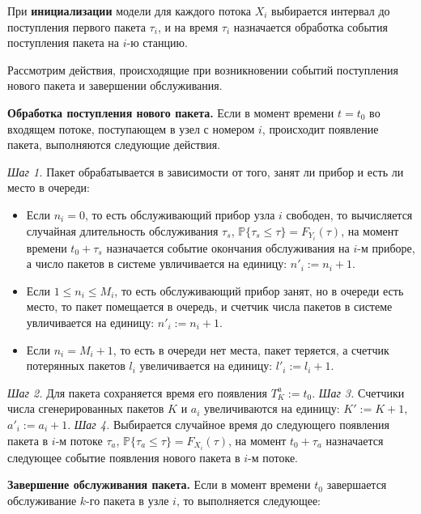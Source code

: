 При \textbf{инициализации} модели для каждого потока $X_i$ выбирается интервал до поступления первого пакета $\tau_i$, и на время $\tau_i$ назначается обработка события поступления пакета на $i$-ю станцию.

Рассмотрим действия, происходящие при возникновении событий поступления нового пакета и завершении обслуживания.

\textbf{Обработка поступления нового пакета.} Если в момент времени $t = t_0$ во входящем потоке, поступающем в узел с номером $i$, происходит появление пакета, выполняются следующие действия.

\textit{Шаг 1.} Пакет обрабатывается в зависимости от того, занят ли прибор и есть ли место в очереди:
\begin{itemize}
  \item Если $n_i = 0$, то есть обслуживающий прибор узла $i$ свободен, то вычисляется случайная длительность обслуживания $\tau_s$, $\mathbb{P}\{\tau_s \leqslant \tau\} = F_{Y_i}(\tau)$, на момент времени $t_0 + \tau_s$ назначается событие окончания обслуживания на $i$-м приборе, а число пакетов в системе увличивается на единицу: $n'_i := n_i + 1$.
  \item Если $1 \leqslant n_i \leqslant M_i$, то есть обслуживающий прибор занят, но в очереди есть место, то пакет помещается в очередь, и счетчик числа пакетов в системе увличивается на единицу: $n'_i := n_i + 1$.
  \item Если $n_i = M_i + 1$, то есть в очереди нет места, пакет теряется, а счетчик потерянных пакетов $l_i$ увеличивается на единицу: $l'_i := l_i + 1$.
\end{itemize}

\textit{Шаг 2.} Для пакета сохраняется время его появления $T_K^a := t_0$.
\textit{Шаг 3.} Счетчики числа сгенерированных пакетов $K$ и $a_i$ увеличиваются на единицу: $K' := K + 1$, $a'_i := a_i + 1$.
\textit{Шаг 4.} Выбирается случайное время до следующего появления пакета в $i$-м потоке $\tau_a$, $\mathbb{P}\{ \tau_a \leqslant \tau \} = F_{X_i}(\tau)$, на момент $t_0 + \tau_a$ назначается следующее событие появления нового пакета в $i$-м потоке.

\textbf{Завершение обслуживания пакета.} Если в момент времени $t_0$ завершается обслуживание $k$-го пакета в узле $i$, то выполняется следующее:

